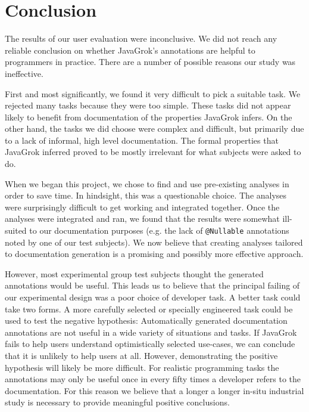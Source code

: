 \section{Conclusion}

The results of our user evaluation were inconclusive.  We did not reach any
reliable conclusion on whether JavaGrok's annotations are helpful to programmers
in practice.  There are a number of possible reasons our study was ineffective.

First and most significantly, we found it very difficult to pick a suitable
task.  We rejected many tasks because they were too simple.  These tasks did not
appear likely to benefit from documentation of the properties JavaGrok infers.
On the other hand, the tasks we did choose were complex and difficult, but primarily due
to a lack of informal, high level documentation.  The formal properties that
JavaGrok inferred proved to be mostly irrelevant for what subjects were asked to
do.

When we began this project, we chose to find and use pre-existing analyses in
order to save time.  In hindsight, this was a questionable choice.  The analyses
were surprisingly difficult to get working and integrated together.  Once the
analyses were integrated and ran, we found that the results were somewhat
ill-suited to our documentation purposes (e.g. the lack of \texttt{@Nullable}
annotations noted by one of our test subjects). We now believe that creating
analyses tailored to documentation generation is a promising and possibly more effective
approach.

However, most experimental group test subjects thought the generated annotations would be
useful.  This leads us to believe that the principal failing of our experimental
design was a poor choice of developer task.  A better task could take two forms.  A more carefully
selected or specially engineered task could be used to test the negative
hypothesis:  Automatically generated documentation annotations are not useful in
a wide variety of situations and tasks.  If JavaGrok fails to help users
understand optimistically selected use-cases, we can conclude that it is
unlikely to help users at all.  However, demonstrating the positive hypothesis
will likely be more difficult.  For realistic programming tasks the annotations
may only be useful once in every fifty times a developer refers to the
documentation.  For this reason we believe that a longer a longer in-situ
industrial study is necessary to provide meaningful positive conclusions.

